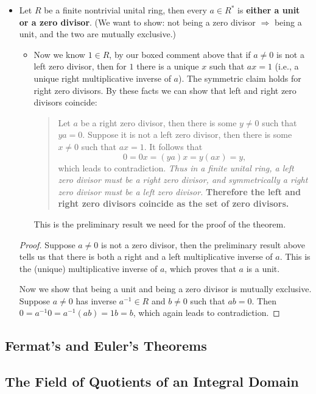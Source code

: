 \documentclass[11pt]{article}
\renewcommand{\implies}{\Rightarrow}
\begin{document}
\begin{itemize}
    \item Let $R$ be a finite nontrivial unital ring, then every $a \in R^*$ is \textbf{either a unit or a zero divisor}. (We want to show: not being a zero divisor $\implies$ being a unit, and the two are mutually exclusive.)
    \begin{itemize}
        \item Now we know $1 \in R$, by our boxed comment above that if $a \neq 0$ is not a left zero divisor, then for $1$ there is a unique $x$ such that $ax=1$ (i.e., a unique right multiplicative inverse of $a$). The symmetric claim holds for right zero divisors. By these facts we can show that left and right zero divisors coincide:
        \begin{quote}
            Let $a$ be a right zero divisor, then there is some $y \neq 0$ such that $ya=0$. Suppose it is not a left zero divisor, then there is some $x \neq 0$ such that $ax = 1$. It follows that \[0=0x=(ya)x=y(ax)=y,\] which leads to contradiction. \emph{Thus in a finite unital ring, a left zero divisor must be a right zero divisor, and symmetrically a right zero divisor must be a left zero divisor.} \textbf{Therefore the left and right zero divisors coincide as the set of zero divisors.}
        \end{quote}
        This is the preliminary result we need for the proof of the theorem.
    \end{itemize}
    \begin{proof}
        Suppose $a \neq 0$ is not a zero divisor, then the preliminary result above tells us that there is both a right and a left multiplicative inverse of $a$. This is the (unique) multiplicative inverse of $a$, which proves that $a$ is a unit.

        Now we show that being a unit and being a zero divisor is mutually exclusive. Suppose $a \neq 0$ has inverse $a^{-1} \in R$ and $b \neq 0$ such that $ab=0$. Then $0 = a^{-1}0 = a^{-1}(ab) = 1b = b$, which again leads to contradiction.
    \end{proof}
\end{itemize}

\subsection{Fermat's and Euler's Theorems}
\subsection{The Field of Quotients of an Integral Domain}
\end{document}
